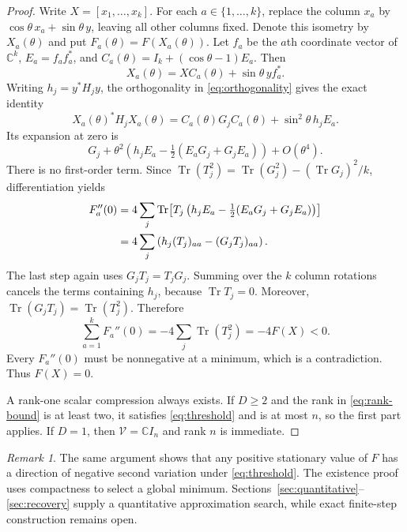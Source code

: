 \documentclass[11pt]{article}
\newcommand{\C}{\mathbb C}
\newcommand{\V}{\mathcal V}
\DeclareMathOperator{\Tr}{Tr}
\theoremstyle{remark}
\newtheorem{remark}[theorem]{Remark}
\numberwithin{equation}{section}
\begin{document}
\begin{proof}
Write $X=[x_1,\ldots,x_k]$. For each $a\in\{1,\ldots,k\}$, replace
the column $x_a$ by $\cos\theta\,x_a+\sin\theta\,y$, leaving all
other columns fixed. Denote this isometry by $X_a(\theta)$ and put
$F_a(\theta)=F(X_a(\theta))$. Let $f_a$ be the $a$th coordinate vector
of $\C^k$, $E_a=f_af_a^*$, and
$C_a(\theta)=I_k+(\cos\theta-1)E_a$. Then
\[
 X_a(\theta)=XC_a(\theta)+\sin\theta\,yf_a^*.
\]
Writing $h_j=y^*H_jy$, the orthogonality in
\eqref{eq:orthogonality} gives the exact identity
\begin{equation}\label{eq:rotation-exact}
 X_a(\theta)^*H_jX_a(\theta)
 =C_a(\theta)G_jC_a(\theta)+\sin^2\theta\,h_jE_a.
\end{equation}
Its expansion at zero is
\begin{equation}\label{eq:rotation-expansion}
 G_j+\theta^2\left(h_jE_a-\tfrac12(E_aG_j+G_jE_a)\right)
 +O(\theta^4).
\end{equation}
There is no first-order term. Since
$\Tr(T_j^2)=\Tr(G_j^2)-(\Tr G_j)^2/k$, differentiation yields
\begin{align}
 F_a''(0)
 &=4\sum_j\Tr\!\left[T_j
 \left(h_jE_a-\tfrac12(E_aG_j+G_jE_a)\right)\right]\notag\\
 &=4\sum_j\left(h_j(T_j)_{aa}-(G_jT_j)_{aa}\right).
 \label{eq:second-variation}
\end{align}
The last step again uses $G_jT_j=T_jG_j$. Summing over the $k$ column
rotations cancels the terms containing $h_j$, because $\Tr T_j=0$.
Moreover, $\Tr(G_jT_j)=\Tr(T_j^2)$. Therefore
\begin{equation}\label{eq:negative-sum}
 \sum_{a=1}^kF_a''(0)
 =-4\sum_j\Tr(T_j^2)=-4F(X)<0.
\end{equation}
Every $F_a''(0)$ must be nonnegative at a minimum, which is a
contradiction. Thus $F(X)=0$.

A rank-one scalar compression always exists. If $D\ge2$ and the rank
in \eqref{eq:rank-bound} is at least two, it satisfies
\eqref{eq:threshold} and is at most $n$, so the first part applies.
If $D=1$, then $\V=\C I_n$ and rank $n$ is immediate.
\end{proof}

\begin{remark}
The same argument shows that any positive stationary value of $F$ has
a direction of negative second variation under \eqref{eq:threshold}.
The existence proof uses compactness to select a global minimum.
Sections~\ref{sec:quantitative}--\ref{sec:recovery} supply a quantitative
approximation search, while exact finite-step construction remains open.
\end{remark}
\end{document}
